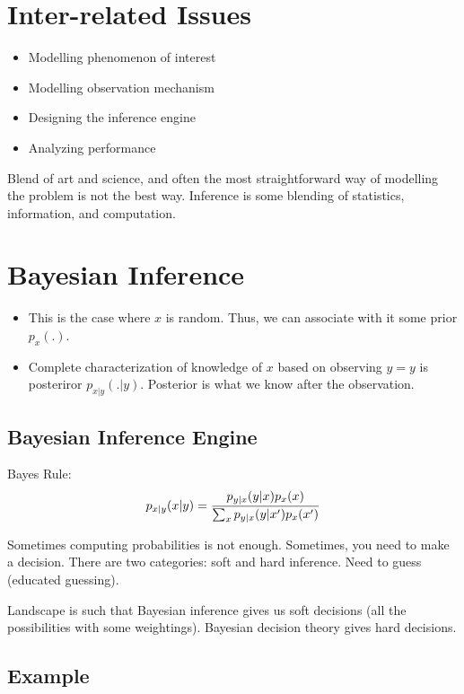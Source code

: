 \documentclass[psamsfonts]{amsart}
\begin{document}
\section{Inter-related Issues}

\begin{itemize}
\item Modelling phenomenon of interest
\item Modelling observation mechanism
\item Designing the inference engine
\item Analyzing performance
\end{itemize}

Blend of art and science, and often the most straightforward way of modelling the problem is not the best way. Inference is some blending of statistics, information, and computation. 

\section{Bayesian Inference}

\begin{itemize}
\item This is the case where $x$ is random. Thus, we can associate with it some prior $p_x(.)$. 
\item Complete characterization of knowledge of $x$ based on observing $y = y$ is posteriror $p_{x|y}(.|y)$. Posterior is what we know after the observation.
\end{itemize}

\subsection{Bayesian Inference Engine}

Bayes Rule:
\begin{eqnarray}
p_{x|y}(x|y) = { {p_{y|x} (y|x) p_x(x) } \over {\sum_{x} p_{y|x}(y|x') p_x(x')} }
\end{eqnarray}

Sometimes computing probabilities is not enough. Sometimes, you need to make a decision. There are two categories: soft and hard inference. Need to guess (educated guessing). 

Landscape is such that Bayesian inference gives us soft decisions (all the possibilities with some weightings). Bayesian decision theory gives hard decisions.

\subsection{Example}
\end{document}
